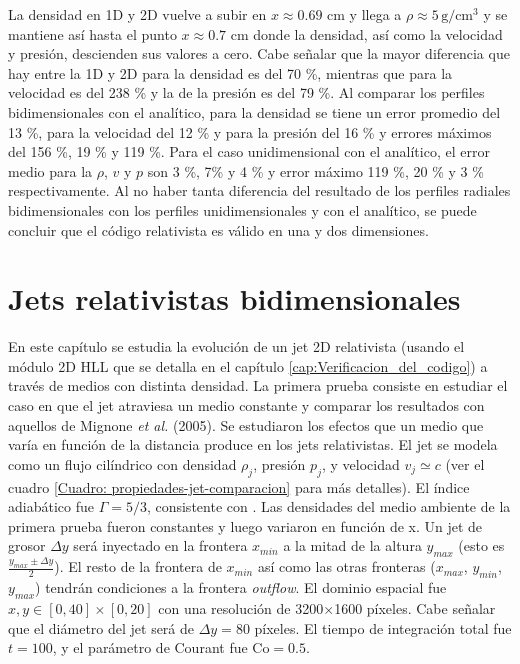 \documentclass[12pt,a4paper]{book}
\begin{document}
La densidad en 1D y 2D vuelve a subir
en $x \approx 0.69$ cm y llega a $\rho \approx 5 \,  \text{g}/ \text{cm}^3$ y 
se mantiene así hasta el punto $x \approx 0.7$ cm 
donde la densidad, así como la velocidad y presión, descienden sus valores a cero.
Cabe señalar que la mayor diferencia que hay entre la 1D y 2D para la densidad es del 70 \%, mientras que para la 
velocidad es del 238 \% y la de la presión es del 79 \%.
Al comparar los perfiles bidimensionales con el analítico, para la densidad se tiene un error promedio del
13 \%, para la velocidad del 12 \% y para la presión del 16 \% y errores máximos del 156 \%, 19 \% y 119 \%. 
Para el caso unidimensional con el analítico, el error medio para la $\rho$, $v$ y $p$ son 
3 \%,  7\% y  4 \% y error máximo 119 \%, 20 \% y 3 \% respectivamente.
Al no haber tanta diferencia del resultado de los perfiles radiales bidimensionales con 
los perfiles unidimensionales y con el analítico, se puede concluir que el código relativista es válido
en una y dos dimensiones.





\chapter{Jets relativistas bidimensionales}

En este capítulo se estudia la evolución de un jet 2D relativista (usando el módulo 2D HLL que se detalla en el capítulo \ref{cap:Verificacion_del_codigo}) a través de medios con distinta densidad. La primera prueba 
consiste en estudiar el caso en que el jet atraviesa un medio constante y  comparar los resultados con aquellos de Mignone \emph{et al.} (2005). 
Se estudiaron los efectos que un medio que varía en función de la distancia produce en los jets relativistas.
El jet se modela como un flujo cilíndrico con densidad $\rho_j$, presión $p_j$,  y velocidad $v_j \simeq c$ 
(ver el cuadro \ref{Cuadro: propiedades-jet-comparacion} para más detalles). El índice adiabático fue $\Gamma = 5/3$, 
consistente con \citet{MB-HLLC-I}. 
Las densidades del medio ambiente de la primera prueba fueron constantes y luego variaron en función de x. Un jet de grosor $\Delta y$ será inyectado 
en la frontera $x_{min}$ a la mitad de la altura $y_{max}$ (esto es $\frac{y_{max} \pm  \Delta y}{2}$). 
El resto de la frontera de $x_{min}$ así como las otras fronteras ($x_{max}$, $y_{min}$, $y_{max}$) tendrán condiciones a la
frontera \emph{outflow}. 
El dominio espacial fue $x, y \in [0,40]\times[0,20]$ con una resolución de 3200$\times$1600 píxeles. 
Cabe señalar que el diámetro del jet será de $\Delta y=80$ píxeles. El tiempo de integración total fue $t = 100$, y el parámetro de Courant fue $\text{Co} = 0.5$.
\end{document}
